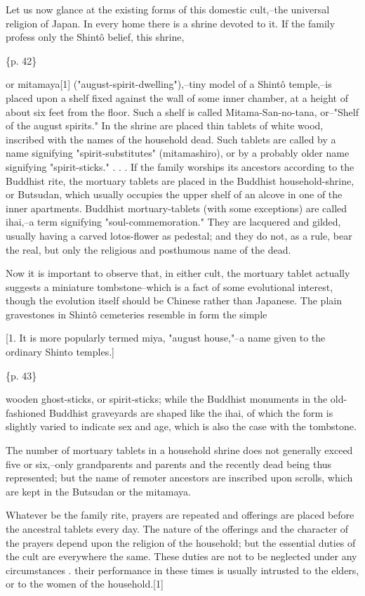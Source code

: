 Let us now glance at the existing forms of this domestic cult,--the universal religion of Japan. In every home there is a shrine devoted to it. If the family profess only the Shintô belief, this shrine,

\{p. 42\}

or mitamaya[1] ("august-spirit-dwelling"),--tiny model of a Shintô temple,--is placed upon a shelf fixed against the wall of some inner chamber, at a height of about six feet from the floor. Such a shelf is called Mitama-San-no-tana, or--"Shelf of the august spirits." In the shrine are placed thin tablets of white wood, inscribed with the names of the household dead. Such tablets are called by a name signifying "spirit-substitutes" (mitamashiro), or by a probably older name signifying "spirit-sticks." . . . If the family worships its ancestors according to the Buddhist rite, the mortuary tablets are placed in the Buddhist household-shrine, or Butsudan, which usually occupies the upper shelf of an alcove in one of the inner apartments. Buddhist mortuary-tablets (with some exceptions) are called ihai,--a term signifying "soul-commemoration." They are lacquered and gilded, usually having a carved lotos-flower as pedestal; and they do not, as a rule, bear the real, but only the religious and posthumous name of the dead.

Now it is important to observe that, in either cult, the mortuary tablet actually suggests a miniature tombstone--which is a fact of some evolutional interest, though the evolution itself should be Chinese rather than Japanese. The plain gravestones in Shintô cemeteries resemble in form the simple

[1. It is more popularly termed miya, "august house,"--a name given to the ordinary Shinto temples.]

\{p. 43\}

wooden ghost-sticks, or spirit-sticks; while the Buddhist monuments in the old-fashioned Buddhist graveyards are shaped like the ihai, of which the form is slightly varied to indicate sex and age, which is also the case with the tombstone.

The number of mortuary tablets in a household shrine does not generally exceed five or six,--only grandparents and parents and the recently dead being thus represented; but the name of remoter ancestors are inscribed upon scrolls, which are kept in the Butsudan or the mitamaya.

Whatever be the family rite, prayers are repeated and offerings are placed before the ancestral tablets every day. The nature of the offerings and the character of the prayers depend upon the religion of the household; but the essential duties of the cult are everywhere the same. These duties are not to be neglected under any circumstances . their performance in these times is usually intrusted to the elders, or to the women of the household.[1]


